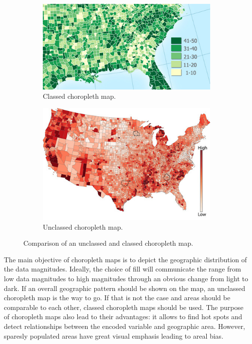 \begin{figure}[!htb]
  \captionsetup[subfigure]{justification=centering}
  \centering
  \begin{subfigure}[b]{0.4\textwidth}
    \includegraphics[width=\textwidth]{images/choropleth/classed.jpg}
    \caption{Classed choropleth map.}
  \end{subfigure}
  \hfill
  \begin{subfigure}[b]{0.4\textwidth}
    \includegraphics[width=\textwidth]{images/choropleth/unclassed.jpg}
    \caption{Unclassed choropleth map.}
  \end{subfigure}
  \caption[
    Comparison of an unclassed and classed choropleth map, Urldate: 07.2016 \newline
    \small\texttt{\url{http://indiemapper.com/app/learnmore.php?l=choropleth}}
  ]{
    Comparison of an unclassed and classed choropleth map.
  }
  \label{fig:classed-unclassed-choropleth}
\end{figure}

The main objective of choropleth maps is to depict the geographic distribution of the data magnitudes. Ideally, the choice of fill will communicate the range from low data magnitudes to high magnitudes through an obvious change from light to dark. If an overall geographic pattern should be shown on the map, an unclassed choropleth map is the way to go. If that is not the case and areas should be comparable to each other, classed choropleth maps should be used.
The purpose of choropleth maps also lead to their advantages: it allows to find hot spots and detect relationships between the encoded variable and geographic area.
However, sparesly populated areas have great visual emphasis leading to areal bias.


